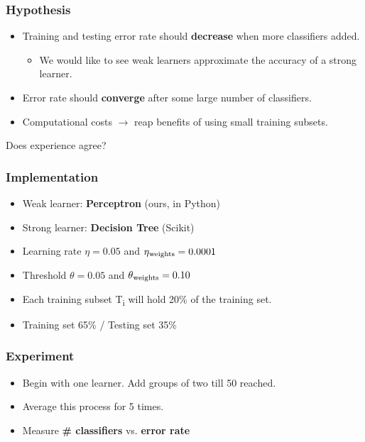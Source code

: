 \documentclass{beamer}
\begin{document}
\begin{frame}
\frametitle{Hypothesis}
\begin{itemize}
\item Training and testing error rate should \textbf{decrease} when more classifiers added. 
\begin{itemize}
\item We would like to see weak learners approximate the accuracy of a strong learner.
\end{itemize}
\item Error rate should \textbf{converge} after some large number of classifiers.
\item Computational costs $\rightarrow$ reap benefits of using small training subsets. 
\end{itemize}
\end{frame}
\begin{frame}
\Huge{\centerline{Does experience agree?}}
\end{frame}
\begin{frame}
\frametitle{Implementation}
\begin{itemize}
\item Weak learner: \textbf{Perceptron} (ours, in Python)
\item Strong learner: \textbf{Decision Tree} (Scikit)
\item Learning rate $\eta = 0.05$ and $\eta\textsubscript{weights} = 0.0001$ 
\item Threshold $\theta = 0.05$ and $\theta\textsubscript{weights} = 0.10$
\item Each training subset T\textsubscript{i} will hold 20\% of the training set.
\item Training set 65\% / Testing set 35\%
\end{itemize}
\end{frame}
\begin{frame}
\frametitle{Experiment}
\begin{itemize}
\item Begin with one learner. Add groups of two till 50 reached. 
\item Average this process for 5 times.  
\item Measure \textbf{\# classifiers} vs. \textbf{error rate} 
\end{itemize}
\end{frame}
\end{document}
